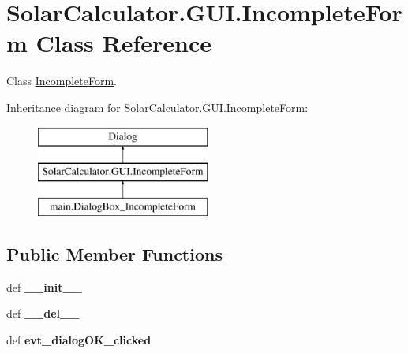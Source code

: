 \hypertarget{class_solar_calculator_1_1_g_u_i_1_1_incomplete_form}{\section{Solar\-Calculator.\-G\-U\-I.\-Incomplete\-Form Class Reference}
\label{class_solar_calculator_1_1_g_u_i_1_1_incomplete_form}
}


Class \hyperlink{class_solar_calculator_1_1_g_u_i_1_1_incomplete_form}{Incomplete\-Form}.  


Inheritance diagram for Solar\-Calculator.\-G\-U\-I.\-Incomplete\-Form\-:\begin{figure}[H]
\begin{center}
\leavevmode
\includegraphics[height=3.000000cm]{class_solar_calculator_1_1_g_u_i_1_1_incomplete_form}
\end{center}
\end{figure}
\subsection*{Public Member Functions}
\begin{DoxyCompactItemize}
\item 
\hypertarget{class_solar_calculator_1_1_g_u_i_1_1_incomplete_form_aaf1e6b40e0cb070faf6ae7f3ece6972a}{def {\bfseries \-\_\-\-\_\-init\-\_\-\-\_\-}}\label{class_solar_calculator_1_1_g_u_i_1_1_incomplete_form_aaf1e6b40e0cb070faf6ae7f3ece6972a}

\item 
\hypertarget{class_solar_calculator_1_1_g_u_i_1_1_incomplete_form_a24b8cd5644712ec3946f602f5031956b}{def {\bfseries \-\_\-\-\_\-del\-\_\-\-\_\-}}\label{class_solar_calculator_1_1_g_u_i_1_1_incomplete_form_a24b8cd5644712ec3946f602f5031956b}

\item 
\hypertarget{class_solar_calculator_1_1_g_u_i_1_1_incomplete_form_a2158910cb033514ce2d42f6b5d51f0e7}{def {\bfseries evt\-\_\-dialog\-O\-K\-\_\-clicked}}\label{class_solar_calculator_1_1_g_u_i_1_1_incomplete_form_a2158910cb033514ce2d42f6b5d51f0e7}

\end{DoxyCompactItemize}
